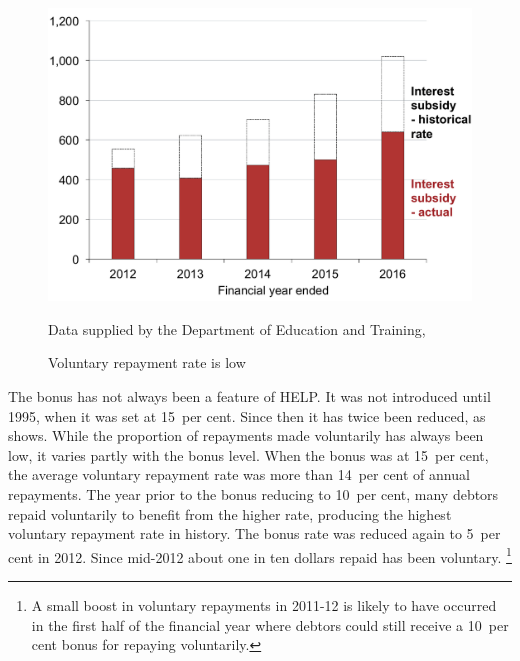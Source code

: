 \documentclass{grattan}
\begin{document}
\begin{figure}
\caption{Voluntary repayment rate is low}\label{fig:fig8-voluntary-repayment-rate-is-low}

\includegraphics[page=8]{atlas/Chartpack.pdf}

{Data supplied by the Department of Education and Training, \textcites{Jackson2003TheHigherEducationContributionScheme}{Education2015Highereducationreport}}
\end{figure}

The bonus has not always been a feature of \gls{HELP}\@.
It was not introduced until 1995, when it was set at 15~per cent.
Since then it has twice been reduced, as  shows.
While the proportion of repayments made voluntarily has always been low, it varies partly with the bonus level.
When the bonus was at 15~per cent, the average voluntary repayment rate was more than 14~per cent of annual repayments.
The year prior to the bonus reducing to 10~per cent, many debtors repaid voluntarily to benefit from the higher rate, producing the highest voluntary repayment rate in history.
The bonus rate was reduced again to 5~per cent in 2012.
Since mid-2012 about one in ten dollars repaid has been voluntary.%
   \footnote{A small boost in voluntary repayments in 2011-12 is likely to have occurred in the first half of the financial year where debtors could still receive a 10~per cent bonus for repaying voluntarily.}
\end{document}
